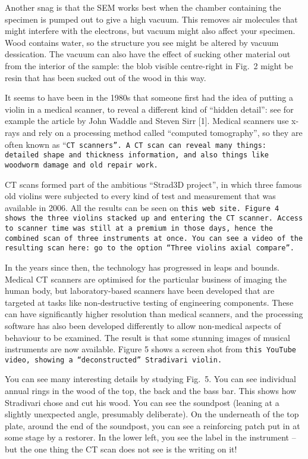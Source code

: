   Another snag is that the SEM works best when the chamber containing the 
  specimen is pumped out to give a high vacuum. This removes air molecules that 
  might interfere with the electrons, but vacuum might also affect your 
  specimen. Wood contains water, so the structure you see might be altered by 
  vacuum dessication. The vacuum can also have the effect of sucking other 
  material out from the interior of the sample: the blob visible centre-right 
  in Fig.\ 2 might be resin that has been sucked out of the wood in this way. 

  It seems to have been in the 1980s that someone first had the idea of putting 
  a violin in a medical scanner, to reveal a different kind of “hidden detail”: 
  see for example the article by John Waddle and Steven Sirr [1]. Medical 
  scanners use x-rays and rely on a processing method called “computed 
  tomography”, so they are often known as “\tt{}CT scanners\rm{}”. A CT scan 
  can reveal many things: detailed shape and thickness information, and also 
  things like woodworm damage and old repair work. 

  CT scans formed part of the ambitious “Strad3D project”, in which three 
  famous old violins were subjected to every kind of test and measurement that 
  was available in 2006. All the results can be seen on \tt{}this web 
  site\rm{}. Figure 4 shows the three violins stacked up and entering the CT 
  scanner. Access to scanner time was still at a premium in those days, hence 
  the combined scan of three instruments at once. You can see a video of the 
  resulting scan \tt{}here\rm{}: go to the option “Three violins axial 
  compare”. 

  In the years since then, the technology has progressed in leaps and bounds. 
  Medical CT scanners are optimised for the particular business of imaging the 
  human body, but laboratory-based scanners have been developed that are 
  targeted at tasks like non-destructive testing of engineering components. 
  These can have significantly higher resolution than medical scanners, and the 
  processing software has also been developed differently to allow non-medical 
  aspects of behaviour to be examined. The result is that some stunning images 
  of musical instruments are now available. Figure 5 shows a screen shot from 
  \tt{}this YouTube video\rm{}, showing a “deconstructed” Stradivari violin. 

  You can see many interesting details by studying Fig.\ 5. You can see 
  individual annual rings in the wood of the top, the back and the bass bar. 
  This shows how Stradivari chose and cut his wood. You can see the soundpost 
  (leaning at a slightly unexpected angle, presumably deliberate). On the 
  underneath of the top plate, around the end of the soundpost, you can see a 
  reinforcing patch put in at some stage by a restorer. In the lower left, you 
  see the label in the instrument -- but the one thing the CT scan does not see 
  is the writing on it! 

